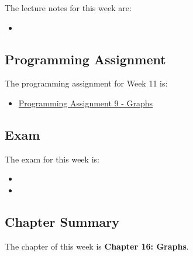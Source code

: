 \noindent The lecture notes for this week are:

\begin{itemize}
    \item {}
\end{itemize}

\subsection{Programming Assignment}

The programming assignment for Week 11 is:

\begin{itemize}
    \item \href{https://github.com/QuantumCompiler/CU/tree/main/CSPB%202270%20-%20Data%20Structures/Assignments/Assignment%209%20-%20Graphs}{Programming Assignment 9 - Graphs}
\end{itemize}

\subsection{Exam}

The exam for this week is:

\begin{itemize}
    \item {}
    \item {}
\end{itemize}

\newpage

\subsection{Chapter Summary}

The chapter of this week is \textbf{Chapter 16: Graphs}.

